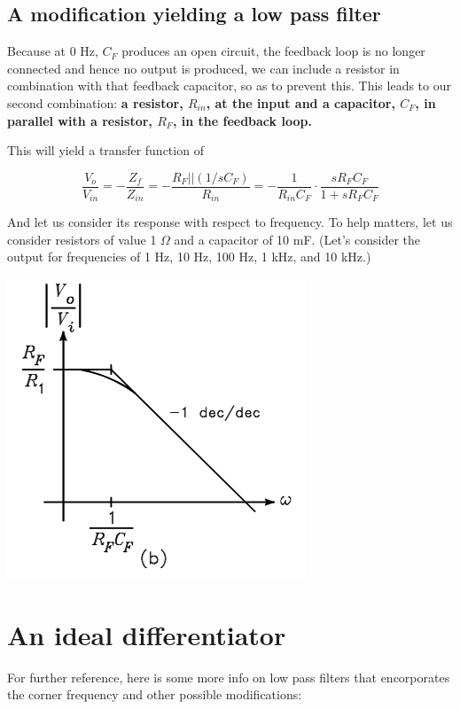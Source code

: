 \documentclass[11pt]{book}
\begin{document}
\subsection{A modification yielding a low pass filter}
Because at 0 Hz, $C_F$ produces an open circuit, the feedback loop is no longer connected and hence no output is produced, we can include a resistor in combination with that feedback capacitor, so as to prevent this. This leads to our second combination: \textbf{a resistor, $R_{in}$, at the input and a capacitor, $C_F$, in parallel with a resistor, $R_F$, in the feedback loop.}

This will yield a transfer function of

\begin{equation}
	\frac{V_o}{V_{in}} = -\frac{Z_f}{Z_{in}} = -\frac{R_F \vert \vert (1/sC_F)}{R_{in}} = -\frac{1}{R_{in}C_F}\cdot \frac{sR_F C_F }{1 + sR_F C_F}
\end{equation}

And let us consider its response with respect to frequency. To help matters, let us consider resistors of value 1 $\Omega$ and a capacitor of 10 mF. (Let's consider the output for frequencies of 1 Hz, 10 Hz, 100 Hz, 1 kHz, and 10 kHz.)

\begin{center}\includegraphics{figures/15.02.png}\end{center}
\section{An ideal differentiator}

For further reference, here is some more info on low pass filters that encorporates the corner frequency and other possible modifications:
\end{document}
